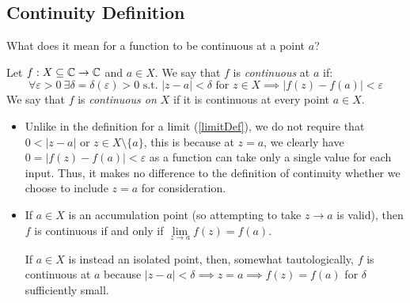 \documentclass[../main.tex]{subfiles}
\begin{document}
\subsection{Continuity Definition}
What does it mean for a function to be continuous at a point $a$?
\begin{definition}[Continuity]
  Let $f: X \subseteq \mathbb{C} \to \mathbb{C}$ and $a \in X$.
  We say that $f$ is \textit{continuous} at $a$ if:
  \[
    \forall \varepsilon > 0\ \exists \delta = \delta(\varepsilon) > 0 \text{ s.t. } |z - a| < \delta \text{ for } z \in X \implies |f(z) - f(a)| < \varepsilon
  \]
  We say that $f$ is \textit{continuous on $X$} if it is continuous at every point $a \in X$.
\end{definition}
\begin{remark}
  \label{continuityLimit}
  \begin{itemize}
    \item Unlike in the definition for a limit (\cref{limitDef}), we do not require that $0 < |z - a|$ or $z \in X \setminus \{a\}$, this is because at $z = a$, we clearly have $0 = |f(z) - f(a)| < \varepsilon$ as a function can take only a single value for each input.
      Thus, it makes no difference to the definition of continuity whether we choose to include $z = a$ for consideration.
    \item If $a \in X$ is an accumulation point (so attempting to take $z \to a$ is valid), then $f$ is continuous if and only if $\lim\limits_{z \to a} f(z) = f(a)$.

      If $a \in X$ is instead an isolated point, then, somewhat tautologically, $f$ is continuous at $a$ because $|z - a| < \delta \implies z = a \implies f(z) = f(a)$ for $\delta$ sufficiently small.
  \end{itemize}
\end{remark}
\end{document}
